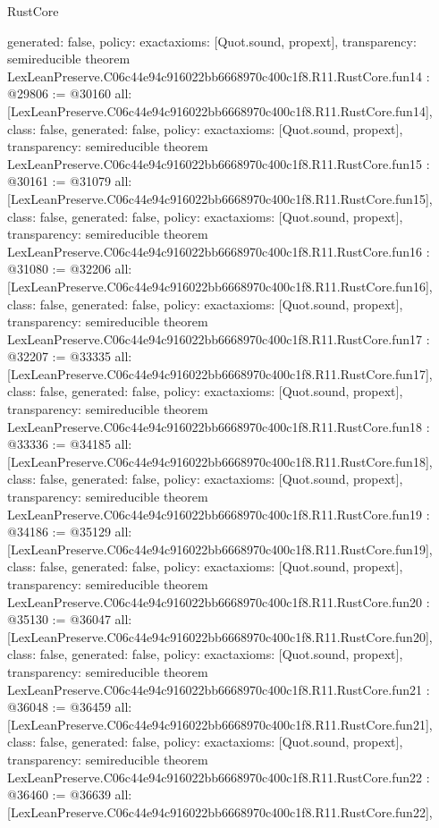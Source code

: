 \begin{lexlean}{RustCore}
\begin{coremodule}
{  generated: false,
  policy: exact{axioms: [Quot.sound, propext]},
  transparency: semireducible
}
theorem LexLeanPreserve.C06c44e94c916022bb6668970c400c1f8.R11.RustCore.fun14 : @29806 := @30160 {
  all: [LexLeanPreserve.C06c44e94c916022bb6668970c400c1f8.R11.RustCore.fun14],
  class: false,
  generated: false,
  policy: exact{axioms: [Quot.sound, propext]},
  transparency: semireducible
}
theorem LexLeanPreserve.C06c44e94c916022bb6668970c400c1f8.R11.RustCore.fun15 : @30161 := @31079 {
  all: [LexLeanPreserve.C06c44e94c916022bb6668970c400c1f8.R11.RustCore.fun15],
  class: false,
  generated: false,
  policy: exact{axioms: [Quot.sound, propext]},
  transparency: semireducible
}
theorem LexLeanPreserve.C06c44e94c916022bb6668970c400c1f8.R11.RustCore.fun16 : @31080 := @32206 {
  all: [LexLeanPreserve.C06c44e94c916022bb6668970c400c1f8.R11.RustCore.fun16],
  class: false,
  generated: false,
  policy: exact{axioms: [Quot.sound, propext]},
  transparency: semireducible
}
theorem LexLeanPreserve.C06c44e94c916022bb6668970c400c1f8.R11.RustCore.fun17 : @32207 := @33335 {
  all: [LexLeanPreserve.C06c44e94c916022bb6668970c400c1f8.R11.RustCore.fun17],
  class: false,
  generated: false,
  policy: exact{axioms: [Quot.sound, propext]},
  transparency: semireducible
}
theorem LexLeanPreserve.C06c44e94c916022bb6668970c400c1f8.R11.RustCore.fun18 : @33336 := @34185 {
  all: [LexLeanPreserve.C06c44e94c916022bb6668970c400c1f8.R11.RustCore.fun18],
  class: false,
  generated: false,
  policy: exact{axioms: [Quot.sound, propext]},
  transparency: semireducible
}
theorem LexLeanPreserve.C06c44e94c916022bb6668970c400c1f8.R11.RustCore.fun19 : @34186 := @35129 {
  all: [LexLeanPreserve.C06c44e94c916022bb6668970c400c1f8.R11.RustCore.fun19],
  class: false,
  generated: false,
  policy: exact{axioms: [Quot.sound, propext]},
  transparency: semireducible
}
theorem LexLeanPreserve.C06c44e94c916022bb6668970c400c1f8.R11.RustCore.fun20 : @35130 := @36047 {
  all: [LexLeanPreserve.C06c44e94c916022bb6668970c400c1f8.R11.RustCore.fun20],
  class: false,
  generated: false,
  policy: exact{axioms: [Quot.sound, propext]},
  transparency: semireducible
}
theorem LexLeanPreserve.C06c44e94c916022bb6668970c400c1f8.R11.RustCore.fun21 : @36048 := @36459 {
  all: [LexLeanPreserve.C06c44e94c916022bb6668970c400c1f8.R11.RustCore.fun21],
  class: false,
  generated: false,
  policy: exact{axioms: [Quot.sound, propext]},
  transparency: semireducible
}
theorem LexLeanPreserve.C06c44e94c916022bb6668970c400c1f8.R11.RustCore.fun22 : @36460 := @36639 {
  all: [LexLeanPreserve.C06c44e94c916022bb6668970c400c1f8.R11.RustCore.fun22],
}
\end{coremodule}
\end{lexlean}

